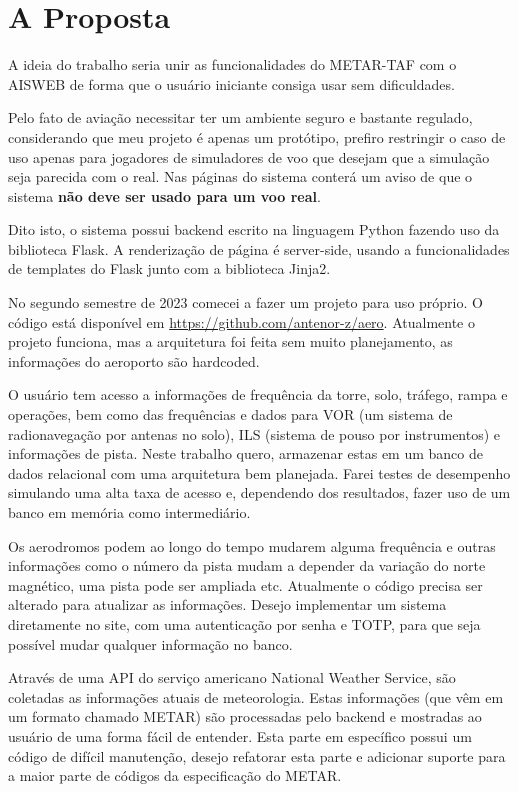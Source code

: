 \chapter{A Proposta}
A ideia do trabalho seria unir as funcionalidades do METAR-TAF com o AISWEB
de forma que o usuário iniciante consiga usar sem dificuldades.

Pelo fato de aviação necessitar ter um ambiente seguro e bastante regulado, considerando
que meu projeto é apenas um protótipo, prefiro restringir o caso de uso apenas
para jogadores de simuladores de voo que desejam que a simulação seja parecida
com o real. Nas páginas do sistema conterá um aviso de que o sistema \textbf{não
deve ser usado para um voo real}.

Dito isto, o sistema possui backend escrito na linguagem Python fazendo uso
da biblioteca Flask. A renderização de página é server-side, usando a funcionalidades
de templates do Flask junto com a biblioteca Jinja2.

No segundo semestre de 2023 comecei a fazer um projeto para uso próprio.
O código está disponível em \url{https://github.com/antenor-z/aero}. Atualmente o
projeto funciona, mas a arquitetura foi feita sem muito planejamento, as
informações do aeroporto são hardcoded.

O usuário tem acesso a informações de frequência da torre, solo, tráfego, rampa
e operações, bem como das frequências e dados para VOR (um sistema de radionavegação
por antenas no solo), ILS (sistema de pouso por instrumentos) e informações
de pista. Neste trabalho quero, armazenar estas
em um banco de dados relacional com uma arquitetura bem planejada. Farei testes
de desempenho simulando uma alta taxa de acesso e, dependendo dos resultados,
fazer uso de um banco em memória como intermediário. 

Os aerodromos podem ao longo do tempo mudarem alguma frequência e outras
informações como o número da pista mudam a depender da variação do norte magnético,
uma pista pode ser ampliada etc.
Atualmente o código precisa ser alterado para atualizar as informações.
Desejo implementar um sistema diretamente no site, com uma autenticação por
senha e TOTP, para que seja possível mudar qualquer informação no banco.

Através de uma API do serviço americano National Weather Service, são coletadas 
as informações atuais de meteorologia. Estas informações (que vêm em um formato
chamado METAR) são processadas pelo backend e mostradas ao usuário de uma forma 
fácil de entender. Esta parte em específico possui um código de difícil manutenção,
desejo refatorar esta parte e adicionar suporte para a maior parte de códigos
da especificação do METAR.
